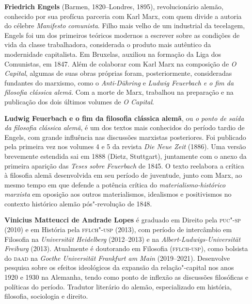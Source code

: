 \textbf{Friedrich Engels} (Barmen, 1820--Londres, 1895), revolucionário
alemão, conhecido por sua profícua parceria com Karl Marx, com quem
divide a autoria do célebre \emph{Manifesto comunista}. Filho mais velho
de um industrial da tecelagem, Engels foi um dos primeiros teóricos
modernos a escrever sobre as condições de vida da classe trabalhadora,
considerada o produto mais autêntico da modernidade capitalista. Em
Bruxelas, auxiliou na formação da Liga dos Comunistas, em 1847. Além de
colaborar com Karl Marx na composição de \emph{O Capital}, algumas de
suas obras próprias foram, posteriormente, consideradas fundantes do
marxismo, como o \emph{Anti-Dühring} e \emph{Ludwig Feuerbach e o fim da
filosofia clássica alemã}. Com a morte de Marx, trabalhou na preparação
e na publicação dos dois últimos volumes de \emph{O Capital}.

\textbf{Ludwig Feuerbach e o fim da filosofia clássica alemã}, ou
\emph{o ponto de saída da filosofia clássica alemã}, é um dos textos
mais conhecidos do período tardio de Engels, com grande influência nas
discussões marxistas posteriores. Foi publicado pela primeira vez nos
volumes 4 e 5 da revista \emph{Die Neue Zeit} (1886). Uma versão
brevemente estendida sai em 1888 (Dietz, Stuttgart), juntamente com o
anexo da primeira aparição das \emph{Teses sobre Feuerbach} de 1845. O
texto reelabora a crítica à filosofia alemã desenvolvida em seu período
de juventude, junto com Marx, ao mesmo tempo em que defende a potência
crítica do \emph{materialismo-histórico marxista} em oposição aos outros
materialismos, idealismos e positivismos no contexto histórico alemão
pós"-revolução de 1848.
        
\textbf{Vinicius Matteucci de Andrade Lopes} é graduado em Direito pela
\textsc{puc"-sp} (2010) e em História pela \textsc{fflch"-usp} (2013),
com período de intercâmbio em Filosofia na \emph{Universität Heidelberg}
(2012--2013) e na \emph{Albert-Ludwigs-Universität Freiburg} (2013).
Atualmente é doutorando em Filosofia (\textsc{fflch-usp}), como bolsista
do \textsc{daad} na \emph{Goethe Universität Frankfurt am Main}
(2019--2021). Desenvolve pesquisa sobre os efeitos ideológicos da
expansão da relação"-capital nos anos 1920 e 1930 na Alemanha, tendo
como ponto de inflexão as discussões filosóficas e políticas do período.
Tradutor literário do alemão, especializado em história, filosofia,
sociologia e direito.



